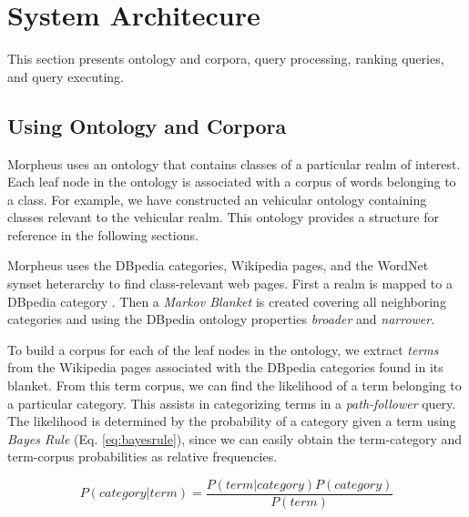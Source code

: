 \section{System Architecure}
\label{sec:systemarch}

This section presents ontology and corpora, query processing, ranking queries, and query executing.

\subsection{Using Ontology and Corpora} 
\label{sec:ontology_corpora}

Morpheus uses an ontology that contains classes of a particular realm of interest. Each leaf node in the ontology is associated with a corpus of words belonging to a class.  For example, we have constructed an vehicular ontology containing classes relevant to the vehicular realm. This ontology provides a structure for reference in the following sections.



Morpheus uses the DBpedia categories, Wikipedia pages, and the WordNet synset heterarchy to find class-relevant web pages. First a realm is mapped to a DBpedia category \cite{Bizer2009}. Then a \emph{Markov Blanket} \cite{PRIS} is created covering all neighboring categories and using the DBpedia ontology properties \emph{broader} and \emph{narrower}.


To build a corpus for each of the leaf nodes in the ontology, we extract \emph{terms} from the Wikipedia pages associated with the DBpedia categories found in its blanket. From this term corpus, we can find the likelihood of a term belonging to a particular category. This assists in categorizing terms in a \emph{path-follower} query. The likelihood is determined by the probability of a category given a term using \textit{Bayes Rule} (Eq. \ref{eq:bayesrule}), since we can easily obtain the term-category and term-corpus probabilities as relative frequencies. 


\begin{equation}
\label{eq:bayesrule}
P (category | term) = \frac{P(term | category) P(category)}{P(term)}
\end{equation}    

